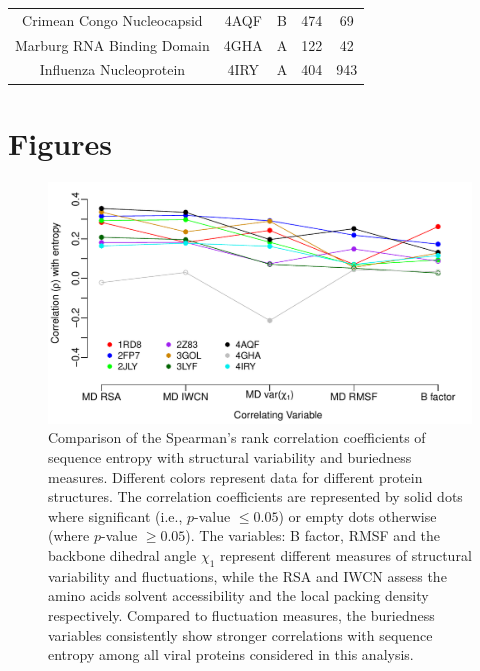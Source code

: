 \documentclass[12pt]{article}
\begin{document}
\begin{table}[htbp]
\begin{center}
\begin{tabular}{c c c c c}
                        Crimean Congo Nucleocapsid      & 4AQF           & B         & 474                & 69          \\ %
                        Marburg RNA Binding Domain      & 4GHA           & A         & 122                & 42          \\ %
                        Influenza Nucleoprotein         & 4IRY           & A         & 404                & 943         \\ %
                        \hline
                        \hline
                \end{tabular}
        \end{center}
\end{table}

\cleardoublepage

\section*{Figures}


\begin{figure}[tbh]
\begin{center}
   \includegraphics[height=0.35\textheight]{cor_entropy_all.pdf}
\end{center}
\caption{Comparison of the Spearman's rank correlation coefficients of sequence entropy with structural variability and buriedness measures. Different colors represent data for different protein structures. The correlation coefficients are represented by solid dots where significant (i.e., $p$-value $\leq0.05$) or empty dots otherwise (where $p$-value $\geq0.05$). The variables: B factor, RMSF and the backbone dihedral angle $\chi_1$ represent different measures of structural variability and fluctuations, while the RSA and IWCN assess the amino acids solvent accessibility and the local packing density respectively. Compared to fluctuation measures, the buriedness variables consistently show stronger correlations with sequence entropy among all viral proteins considered in this analysis.}
\label{fig:cor_entropy_all}
\end{figure}
\end{document}
